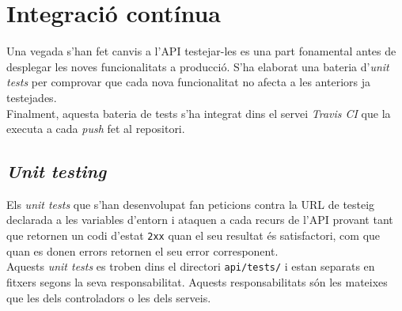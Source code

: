 \section{Integració contínua}

Una vegada s'han fet canvis a l'\ac{API} testejar-les es una part fonamental antes de desplegar les noves funcionalitats a producció. S'ha elaborat una bateria d'\emph{unit tests} per comprovar que cada nova funcionalitat no afecta a les anteriors ja testejades.\\

Finalment, aquesta bateria de tests s'ha integrat dins el servei \emph{Travis CI} que la executa a cada \emph{push} fet al repositori.

\subsection{\emph{Unit testing}}

Els \emph{unit tests} que s'han desenvolupat fan peticions contra la \ac{URL} de testeig declarada a les variables d'entorn i ataquen a cada recurs de l'\ac{API} provant tant que retornen un codi d'estat \texttt{2xx} quan el seu resultat és satisfactori, com que quan es donen errors retornen el seu error corresponent.\\

Aquests \emph{unit tests} es troben dins el directori \texttt{api/tests/} i estan separats en fitxers segons la seva responsabilitat. Aquests responsabilitats són les mateixes que les dels controladors o les dels serveis. 
